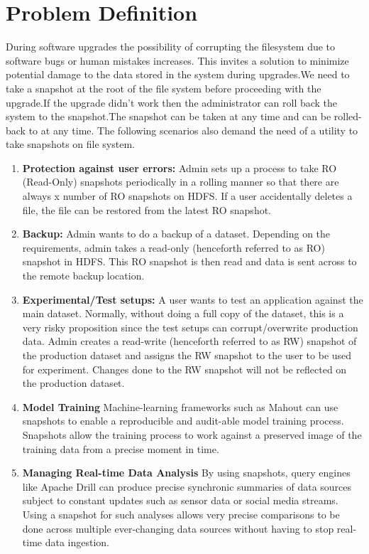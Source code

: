 \section{Problem Definition}
During software upgrades the possibility of corrupting the filesystem due to software bugs or human mistakes increases. This invites a solution to  minimize potential damage to the data stored in the system during upgrades.We need to take a snapshot at the root of the file system before proceeding with the upgrade.If the upgrade didn't work then the administrator can roll back the system to the snapshot.The snapshot can be taken at any time and can be rolled-back to at any time. The following scenarios also demand the need of a utility to take snapshots on file system.
\begin{enumerate}
\item \textbf{Protection against user errors:} Admin sets up a process to take RO (Read-Only) snapshots periodically in a
rolling manner so that there are always x number of RO snapshots on HDFS. If a user
accidentally deletes a file, the file can be restored from the latest RO snapshot.
\item \textbf{Backup:} Admin wants to do a backup of a dataset. Depending on the requirements, admin takes
a read-only (henceforth referred to as RO) snapshot in HDFS. This RO snapshot is then read and
data is sent across to the remote backup location.
\item \textbf{Experimental/Test setups:} A user wants to test an application against the main dataset. Normally, without doing a full copy of the dataset, this is a very risky proposition since the test setups can corrupt/overwrite production data. Admin creates a read-write (henceforth referred to as RW) snapshot of the production dataset and assigns the RW snapshot to the user to be used for experiment. Changes done to the RW snapshot will not be reflected on the production dataset.
\item \textbf{Model Training}
Machine-learning frameworks such as Mahout can use snapshots to enable a reproducible and audit-able model training process. Snapshots allow the training process to work against a preserved image of the training data from a precise moment in time. 
\item \textbf{Managing Real-time Data Analysis}
By using snapshots, query engines like Apache Drill can produce precise synchronic summaries of data sources subject to constant updates such as sensor data or social media streams. Using a snapshot for such analyses allows very precise comparisons to be done across multiple ever-changing data sources without having to stop real-time data ingestion.

\end{enumerate}
